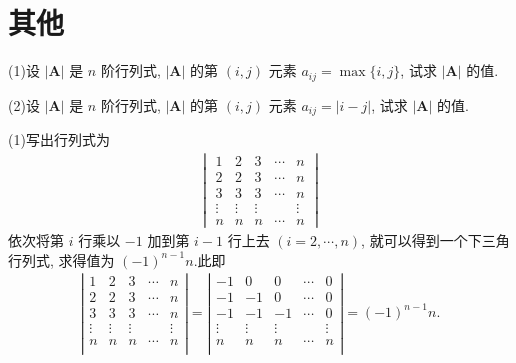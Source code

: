 \documentclass[../../main.tex]{subfiles}%
\begin{document}
\section{其他}

\begin{example}\label{example--经典行列式1}
(1)设 \(|\boldsymbol{A}|\) 是 \(n\) 阶行列式, \(|\boldsymbol{A}|\) 的第 \((i,j)\) 元素 \(a_{ij}=\max\{i,j\}\), 试求 \(|\boldsymbol{A}|\) 的值.
 
(2)设 \(|\boldsymbol{A}|\) 是 \(n\) 阶行列式, \(|\boldsymbol{A}|\) 的第 \((i,j)\) 元素 \(a_{ij}=|i - j|\), 试求 \(|\boldsymbol{A}|\) 的值.
\end{example}
\begin{solution}
(1)写出行列式为
\begin{align*}
\begin{vmatrix}
1 & 2 & 3 & \cdots & n \\
2 & 2 & 3 & \cdots & n \\
3 & 3 & 3 & \cdots & n \\
\vdots & \vdots & \vdots & & \vdots \\
n & n & n & \cdots & n
\end{vmatrix}
\end{align*}
依次将第 \(i\) 行乘以 \(-1\) 加到第 \(i - 1\) 行上去 \((i = 2,\cdots,n)\), 就可以得到一个下三角行列式, 求得值为 \((-1)^{n - 1}n\).此即
\begin{align*}
\left| \begin{matrix}
1&		2&		3&		\cdots&		n\\
2&		2&		3&		\cdots&		n\\
3&		3&		3&		\cdots&		n\\
\vdots&		\vdots&		\vdots&		&		\vdots\\
n&		n&		n&		\cdots&		n\\
\end{matrix} \right|=\left| \begin{matrix}
-1&		0&		0&		\cdots&		0\\
-1&		-1&		0&		\cdots&		0\\
-1&		-1&		-1&		\cdots&		0\\
\vdots&		\vdots&		\vdots&		&		\vdots\\
n&		n&		n&		\cdots&		n\\
\end{matrix} \right|=\left( -1 \right) ^{n-1}n.
\end{align*}


\end{solution}
\end{document}
